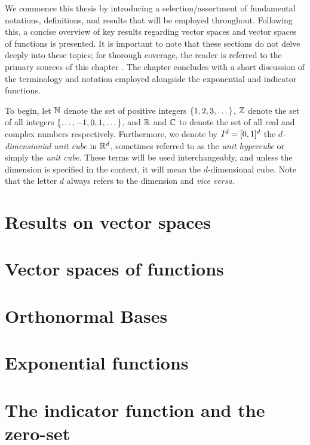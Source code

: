 \documentclass[../thesis.tex]{subfiles}
\begin{document}
We commence this thesis by introducing a selection/assortment of fundamental notations, definitions, and results that will be employed throughout. Following this, a concise overview of key results regarding vector spaces and vector spaces of functions is presented. It is important to note that these sections do not delve deeply into these topics; for thorough coverage, the reader is referred to the primary sources of this chapter \cite{heilMetricsNormsInner2018,heilIntroductionRealAnalysis2019}. The chapter concludes with a short discussion of the terminology and notation employed alongside the exponential and indicator functions.

To begin, let $\mathbb{N}$ denote the set of positive integers $\{1,2,3, \dots\}$, $\mathbb{Z}$ denote the set of all integers $\{\dots, -1,0,1, \dots\}$, and $\mathbb{R}$ and $\mathbb{C}$ to denote the set of all real and complex numbers respectively. Furthermore, we denote by $I^d = [0,1]^d$ the \emph{$d$-dimensionial unit cube} in $\mathbb{R}^d$, sometimes referred to as the \emph{unit hypercube} or simply the \emph{unit cube}. These terms will be used interchangeably, and unless the dimension is specified in the context, it will mean the $d$-dimensional cube. Note that the letter $d$ always refers to the dimension and \emph{vice versa}.

\section{Results on vector spaces}  %
    

\section{Vector spaces of functions}  %
    

\section{Orthonormal Bases}
    

\section{Exponential functions}
    

\section{The indicator function and the zero-set}
    
\end{document}
